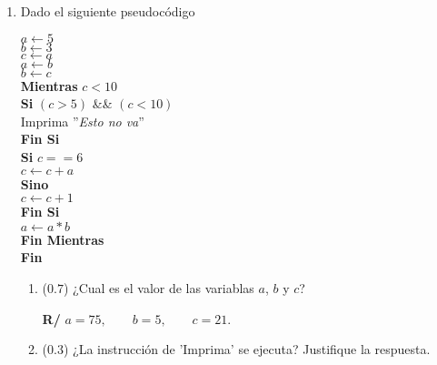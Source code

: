 \documentclass[12pt]{article}
\begin{document}
\vspace{-.5cm}
  \begin{enumerate}[leftmargin=*,widest=9]


    \item Dado el siguiente pseudocódigo


\(a\gets 5\)\\
\(b\gets 3\)\\
\(c\gets a\)\\
\(a\gets b\)\\
\(b\gets c\)\\
\textbf{Mientras} \(c < 10\)\\
\hspace*{1cm}\textbf{Si} \((c > 5)\) \&\& \((c < 10)\)\\
\hspace*{1cm}\hspace*{1cm}Imprima ''\textit{Esto no va}''\\
\hspace*{1cm}\textbf{Fin Si}\\
\hspace*{1cm}\textbf{Si} \(c == 6\)\\
\hspace*{1cm}\hspace*{1cm}\(c \gets c + a\)\\
\hspace*{1cm}\textbf{Sino}\\
\hspace*{1cm}\hspace*{1cm}\(c \gets c + 1\)\\
\hspace*{1cm}\textbf{Fin Si}\\
\hspace*{1cm}\(a \gets a * b\)\\
\textbf{Fin Mientras}\\
\textbf{Fin}\\


\vspace{-.5cm}

    \begin{enumerate}[label=\alph*]
    \item (\(0.7\)) ¿Cual es el valor de las variablas \(a\), \(b\) y \(c\)?


    \textbf{R/} \(a = 75, \qquad b=5, \qquad c=21. \)

    \item (\(0.3\)) ¿La instrucción de 'Imprima' se ejecuta? Justifique la respuesta.



\end{enumerate}
\end{enumerate}
\end{document}
